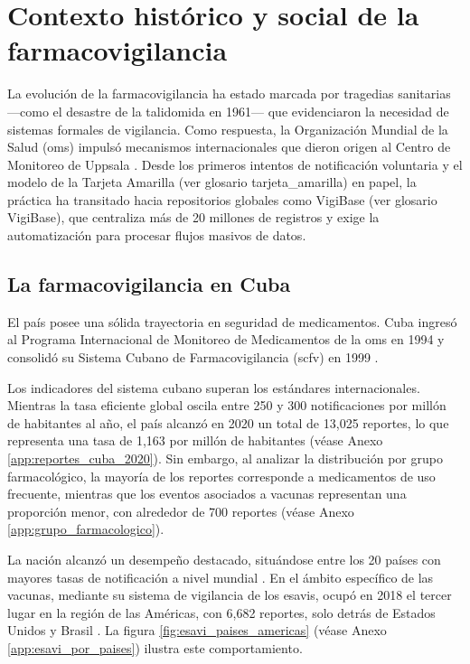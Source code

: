 \section{Contexto histórico y social de la farmacovigilancia}\label{section:contextoHistoricoSocial}

La evolución de la farmacovigilancia ha estado marcada por tragedias sanitarias —como el desastre de la talidomida en 1961— que evidenciaron la necesidad de sistemas formales de vigilancia\cite{tarrago_farmacovigilancia_cuba_2019,palacios2021talidomida}. 
Como respuesta, la Organización Mundial de la Salud (\gls{oms}) impulsó mecanismos internacionales que dieron origen al Centro de Monitoreo de Uppsala \cite{barrero2022notificacion}. 
Desde los primeros intentos de notificación voluntaria y el modelo de la Tarjeta Amarilla (ver glosario \gls{tarjeta_amarilla}) en papel, la práctica ha transitado hacia repositorios globales como VigiBase (ver glosario \gls{VigiBase}), que centraliza más de 20 millones de registros y exige la automatización para procesar flujos masivos de datos.

\subsection{La farmacovigilancia en Cuba}

El país posee una sólida trayectoria en seguridad de medicamentos. 
Cuba ingresó al Programa Internacional de Monitoreo de Medicamentos de la \gls{oms} en 1994 y consolidó su Sistema Cubano de Farmacovigilancia (\gls{scfv}) en 1999 \cite{tarrago_farmacovigilancia_cuba_2019, paho_vigilancia_medicamentos_cuba}.

Los indicadores del sistema cubano superan los estándares internacionales. Mientras la tasa eficiente global oscila entre 250 y 300 notificaciones por millón de habitantes al año, el país alcanzó en 2020 un total de 13,025 reportes, lo que representa una tasa de 1,163 por millón de habitantes \cite{cecmed_farmacovigilancia_cuba_2020} (véase Anexo \ref{app:reportes_cuba_2020}). 
Sin embargo, al analizar la distribución por grupo farmacológico, la mayoría de los reportes corresponde a medicamentos de uso frecuente, mientras que los eventos asociados a vacunas representan una proporción menor, con alrededor de 700 reportes (véase Anexo \ref{app:grupo_farmacologico}).

La nación alcanzó un desempeño destacado, situándose entre los 20 países con mayores tasas de notificación a nivel mundial \cite{normas_farmacovigilancia_cuba_2012}. En el ámbito específico de las vacunas, mediante su sistema de vigilancia de los \glspl{esavi}, ocupó en 2018 el tercer lugar en la región de las Américas, con 6,682 reportes, solo detrás de Estados Unidos y Brasil \cite{ops_manual_esavi_2021}. La figura \ref{fig:esavi_paises_americas} (véase Anexo \ref{app:esavi_por_paises}) ilustra este comportamiento.

